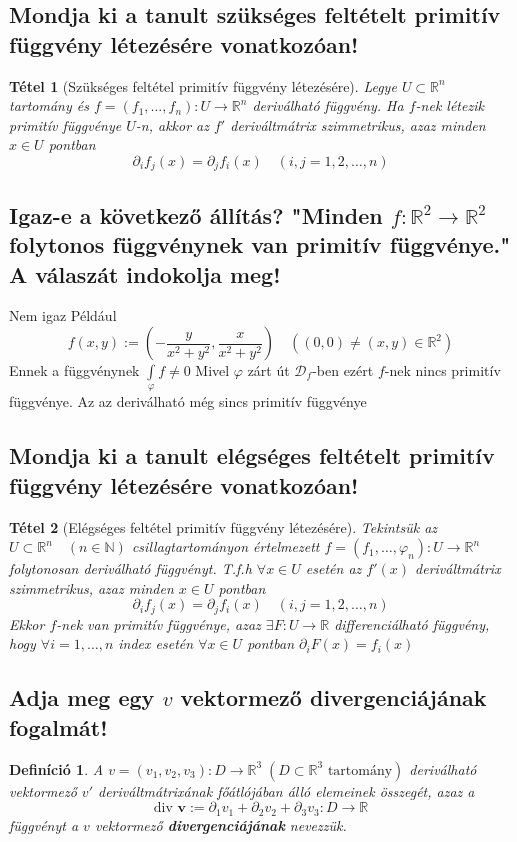 \documentclass[12pt,a4paper]{article}
\newcommand{\R}{\mathbb{R}}
\newcommand{\N}{\mathbb{N}}
\newcommand{\f}{\varphi}
\newcommand{\bb}[1]{\left( #1 \right)}
\newtheorem{tet}{Tétel}[section]
\newtheorem{defi}{Definíció}[section]
\begin{document}
\subsection{Mondja ki a tanult szükséges feltételt primitív függvény létezésére vonatkozóan!}
\begin{tet}[Szükséges feltétel primitív függvény létezésére]
Legye $U \subset \R^n$ tartomány és $f = \bb{f_1,\ldots,f_n} : U \to \R^n$ deriválható függvény. Ha $f$-nek létezik primitív függvénye $U$-n, akkor az $f'$ deriváltmátrix szimmetrikus, azaz minden $x \in U$ pontban
\[
\partial_if_j(x)=\partial_jf_i(x) \quad \bb{i,j = 1,2,\ldots,n}
\]
\end{tet}
\subsection{Igaz-e a következő állítás? "Minden $f : \R^2 \to \R^2$ folytonos függvénynek van primitív függvénye." A válaszát indokolja meg!}
Nem igaz
Például
\[
f(x,y) := \bb{-\frac{y}{x^2+y^2},\frac{x}{x^2+y^2}} \quad \bb{(0,0) \neq (x,y) \in \R^2}
\]
Ennek a függvénynek $\int\limits_\f f \neq 0$ Mivel $\f$ zárt út $\mathcal{D}_f$-ben ezért $f$-nek nincs primitív függvénye. Az az deriválható még sincs primitív függvénye
\subsection{Mondja ki a tanult elégséges feltételt primitív függvény létezésére vonatkozóan!}
\begin{tet}[Elégséges feltétel primitív függvény létezésére]
Tekintsük az $U \subset \R^n \quad (n\in \N)$ csillagtartományon értelmezett $f=\bb{f_1,\ldots,\f_n} : U \to \R^n$ folytonosan deriválható függvényt.
T.f.h $\forall x \in U$ esetén az $f'(x)$ deriváltmátrix szimmetrikus, azaz minden $x \in U$ pontban
\[
\partial_if_j(x)=\partial_jf_i(x) \quad \bb{i,j = 1,2,\ldots,n}
\]
Ekkor $f$-nek van primitív függvénye, azaz $\exists F: U \to \R$ differenciálható függvény, hogy $\forall i = 1,\ldots,n$ index esetén $\forall x \in U$ pontban $\partial_iF(x)=f_i(x)$ 
\end{tet}
\subsection{Adja meg egy $v$ vektormező divergenciájának fogalmát!}
\begin{defi}
A $v = \bb{v_1,v_2,v_3} : D \to \R^3 \; \bb{D \subset \R^3 \text{ tartomány} }$ deriválható vektormező $v'$ deriváltmátrixának főátlójában álló elemeinek összegét, azaz a
\[
\text{div } \textbf{v} := \partial_1v_1+\partial_2v_2 + \partial_3v_3 : D \to \R
\]
függvényt a $v$ vektormező \textbf{divergenciájának} nevezzük.
\end{defi}
\end{document}
